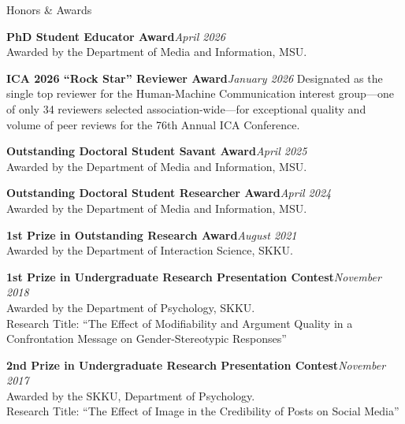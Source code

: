 \documentclass{resume} %
\begin{document}
\begin{rSection}{Honors \& Awards}


{\bf PhD Student Educator Award}\hfill {\em April 2026} 
\\ Awarded by the Department of Media and Information, MSU.

{\bf ICA 2026 ``Rock Star'' Reviewer Award}\hfill {\em January 2026} 
Designated as the single top reviewer for the Human-Machine Communication interest group---one of only 34 reviewers selected association-wide---for exceptional quality and volume of peer reviews for the 76th Annual ICA Conference.



{\bf Outstanding Doctoral Student Savant Award}\hfill {\em April 2025} 
\\ Awarded by the Department of Media and Information, MSU.


{\bf Outstanding Doctoral Student Researcher Award}\hfill {\em April 2024} 
\\ Awarded by the Department of Media and Information, MSU.

{\bf 1st Prize in Outstanding Research Award}\hfill {\em August 2021} 
\\ Awarded by the Department of Interaction Science, SKKU.

{\bf 1st Prize in Undergraduate Research Presentation Contest}\hfill {\em November 2018} 
\\ Awarded by the Department of Psychology, SKKU.
\\ Research Title: “The Effect of Modifiability and Argument Quality in a Confrontation Message on Gender-Stereotypic Responses”


{\bf 2nd Prize in Undergraduate Research Presentation Contest}\hfill {\em November 2017} 
\\ Awarded by the SKKU, Department of Psychology.
\\ Research Title: “The Effect of Image in the Credibility of Posts on Social Media”
\end{rSection}
\end{document}
